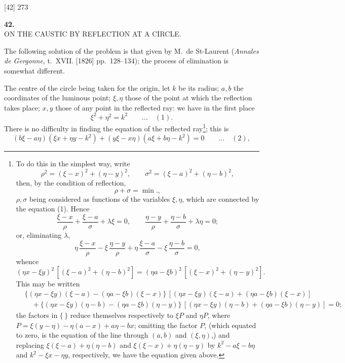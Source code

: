 \documentclass[11pt]{article}
\begin{document}
\vspace{2em}

\begin{center}\small [42] \hfill 273\end{center}

\vspace{2em}
\begin{center}
{\Large\bfseries 42.}\\[1em]
{\large ON THE CAUSTIC BY REFLECTION AT A CIRCLE.}
\end{center}


\bigskip

The following solution of the problem is that given by M.~de St-Laurent (\textit{Annales de Gergonne}, t.~XVII. [1826] pp.~128--134); the process of elimination is somewhat different.

The centre of the circle being taken for the origin, let $k$ be its radius; $a, b$ the coordinates of the luminous point; $\xi, \eta$ those of the point at which the reflection takes place; $x, y$ those of any point in the reflected ray: we have in the first place
\[
  \xi^{2} + \eta^{2} = k^{2}\qquad\dots\quad (1).
\]
There is no difficulty in finding the equation of the reflected ray\footnote{To do this in the simplest way, write
\[
  \rho^{2} = (\xi-x)^{2} + (\eta-y)^{2},\qquad \sigma^{2} = (\xi-a)^{2} + (\eta-b)^{2},
\]
then, by the condition of reflection,
\[
  \rho + \sigma = \min.,
\]
$\rho,\sigma$ being considered as functions of the variables $\xi, \eta$, which are connected by the equation (1). Hence
\[
  \frac{\xi-x}{\rho} + \frac{\xi-a}{\sigma} + \lambda\xi = 0,\qquad
  \frac{\eta-y}{\rho} + \frac{\eta-b}{\sigma} + \lambda\eta = 0;
\]
or, eliminating $\lambda$,
\[
  \eta\,\frac{\xi-x}{\rho} - \xi\,\frac{\eta-y}{\rho} + \eta\,\frac{\xi-a}{\sigma} - \xi\,\frac{\eta-b}{\sigma} = 0,
\]
whence
\[
  (\eta x - \xi y)^{2}\,[(\xi-a)^{2} + (\eta-b)^{2}] = (\eta a - \xi b)^{2}\,[(\xi-x)^{2} + (\eta-y)^{2}].
\]
This may be written
\begin{align*}
  &\{(\eta x - \xi y)(\xi-a) - (\eta a - \xi b)(\xi-x)\}\,[(\eta x - \xi y)(\xi-a) + (\eta a - \xi b)(\xi-x)] \\
  &\quad + \{(\eta x - \xi y)(\eta-b) - (\eta a - \xi b)(\eta-y)\}\,[(\eta x - \xi y)(\eta-b) + (\eta a - \xi b)(\eta-y)] = 0;
\end{align*}
the factors in $\{\,\}$ reduce themselves respectively to $\xi P$ and $\eta P$, where $P = \xi(y-\eta) - \eta(a-x) + a\eta - b x$; omitting the factor $P$, (which equated to zero, is the equation of the line through $(a,b)$ and $(\xi, \eta)$,) and replacing $\xi(\xi-a) + \eta(\eta-b)$ and $\xi(\xi-x) + \eta(\eta-y)$ by $k^{2} - a\xi - b\eta$ and $k^{2} - \xi x - \eta y$, respectively, we have the equation given above.}; this is
\[
  (b\xi - a\eta)(\xi x + \eta y - k^{2}) + (y\xi - x\eta)(a\xi + b\eta - k^{2}) = 0\qquad\dots\quad (2),
\]
\end{document}
